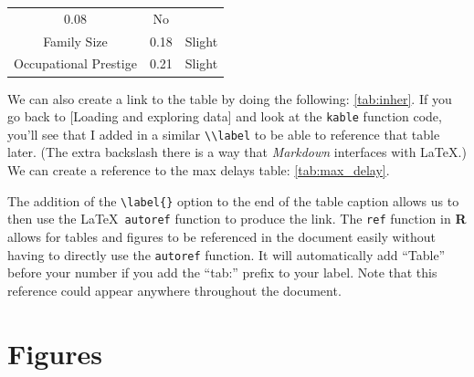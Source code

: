 \documentclass[12pt,twoside]{amherstthesis}
\begin{document}
\begin{longtable}[]{@{}ccc@{}}
\begin{minipage}[t]{0.47\columnwidth}
  0.08\strut
  \end{minipage} & \begin{minipage}[t]{0.16\columnwidth}\centering\strut
  No\strut
  \end{minipage}\tabularnewline
  \begin{minipage}[t]{0.29\columnwidth}\centering\strut
  Family Size\strut
  \end{minipage} & \begin{minipage}[t]{0.47\columnwidth}\centering\strut
  0.18\strut
  \end{minipage} & \begin{minipage}[t]{0.16\columnwidth}\centering\strut
  Slight\strut
  \end{minipage}\tabularnewline
  \begin{minipage}[t]{0.29\columnwidth}\centering\strut
  Occupational Prestige\strut
  \end{minipage} & \begin{minipage}[t]{0.47\columnwidth}\centering\strut
  0.21\strut
  \end{minipage} & \begin{minipage}[t]{0.16\columnwidth}\centering\strut
  Slight\strut
  \end{minipage}\tabularnewline
  \bottomrule
  \end{longtable}
  
  We can also create a link to the table by doing the following:
  \autoref{tab:inher}. If you go back to {[}Loading and exploring data{]}
  and look at the \texttt{kable} function code, you'll see that I added in
  a similar \texttt{\textbackslash{}\textbackslash{}label} to be able to
  reference that table later. (The extra backslash there is a way that
  \emph{Markdown} interfaces with \LaTeX.) We can create a reference to
  the max delays table: \autoref{tab:max_delay}.
  
  The addition of the \texttt{\textbackslash{}label\{\}} option to the end
  of the table caption allows us to then use the \LaTeX~\texttt{autoref}
  function to produce the link. The \texttt{ref} function in \textbf{R}
  allows for tables and figures to be referenced in the document easily
  without having to directly use the \texttt{autoref} function. It will
  automatically add ``Table'' before your number if you add the ``tab:''
  prefix to your label. Note that this reference could appear anywhere
  throughout the document.
  
  \clearpage
  
  \section{Figures}\label{figures}
  
\end{document}

